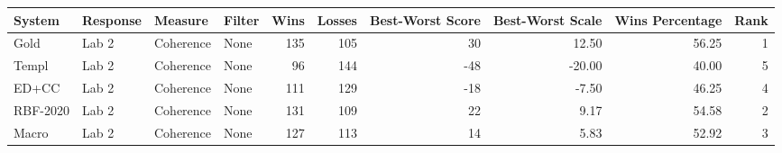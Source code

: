 \begin{tabular}{llllrrrrrr}
\toprule
System & Response & Measure & Filter & Wins & Losses & Best-Worst Score & Best-Worst Scale & Wins Percentage & Rank \\
\midrule
Gold & Lab 2 & Coherence & None & 135 & 105 & 30 & 12.50 & 56.25 & 1 \\
Templ & Lab 2 & Coherence & None & 96 & 144 & -48 & -20.00 & 40.00 & 5 \\
ED+CC & Lab 2 & Coherence & None & 111 & 129 & -18 & -7.50 & 46.25 & 4 \\
RBF-2020 & Lab 2 & Coherence & None & 131 & 109 & 22 & 9.17 & 54.58 & 2 \\
Macro & Lab 2 & Coherence & None & 127 & 113 & 14 & 5.83 & 52.92 & 3 \\
\bottomrule
\end{tabular}
